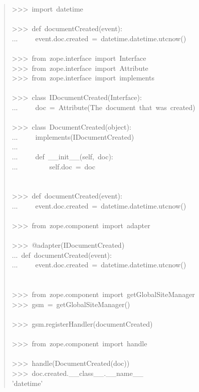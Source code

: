 \documentclass[14pt,a4paper,openany,twoside,final]{extbook}
\begin{document}
\begin{quote}{\ttfamily \raggedright \noindent
>{}>{}>~import~datetime\\
~\\
>{}>{}>~def~documentCreated(event):\\
...~~~~~event.doc.created~=~datetime.datetime.utcnow()\\
~\\
>{}>{}>~from~zope.interface~import~Interface\\
>{}>{}>~from~zope.interface~import~Attribute\\
>{}>{}>~from~zope.interface~import~implements\\
~\\
>{}>{}>~class~IDocumentCreated(Interface):\\
...~~~~~doc~=~Attribute(\textquotedbl{}The~document~that~was~created\textquotedbl{})\\
~\\
>{}>{}>~class~DocumentCreated(object):\\
...~~~~~implements(IDocumentCreated)\\
...\\
...~~~~~def~\_\_init\_\_(self,~doc):\\
...~~~~~~~~~self.doc~=~doc\\
~\\
~\\
>{}>{}>~def~documentCreated(event):\\
...~~~~~event.doc.created~=~datetime.datetime.utcnow()\\
~\\
>{}>{}>~from~zope.component~import~adapter\\
~\\
>{}>{}>~@adapter(IDocumentCreated)\\
...~def~documentCreated(event):\\
...~~~~~event.doc.created~=~datetime.datetime.utcnow()\\
~\\
~\\
>{}>{}>~from~zope.component~import~getGlobalSiteManager\\
>{}>{}>~gsm~=~getGlobalSiteManager()\\
~\\
>{}>{}>~gsm.registerHandler(documentCreated)\\
~\\
>{}>{}>~from~zope.component~import~handle\\
~\\
>{}>{}>~handle(DocumentCreated(doc))\\
>{}>{}>~doc.created.\_\_class\_\_.\_\_name\_\_\\
'datetime'
}
\end{quote}
\end{document}
